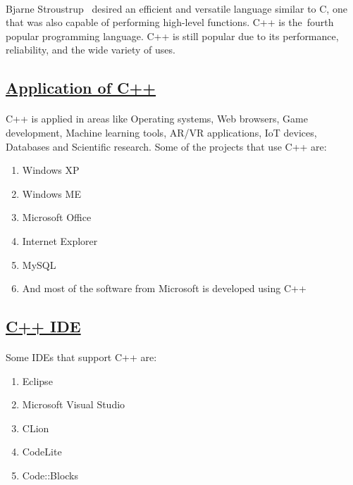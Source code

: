 \documentclass[[12pt]{article}
\begin{document}
	\paragraph{}
	Bjarne Stroustrup  desired an efficient and versatile language similar to C, one that was also capable of  performing  high-level functions. C++ is the fourth popular programming language. C++ is still popular due to its performance, reliability, and the wide variety of uses.
				
	
	\subsection*{\underline{Application of C++}}
	\paragraph{}
	C++ is applied in areas like Operating systems, Web browsers, Game development, Machine learning tools, AR/VR applications, IoT devices, Databases and Scientific research.
	Some of the projects that use C++ are:
	
	
	\begin{enumerate}
		\item Windows XP
		\item Windows ME
		\item Microsoft Office
		\item Internet Explorer
		\item MySQL
		\item And most of the software from Microsoft is developed using C++ 
		
		
	\end{enumerate}
	
	
	\subsection*{\underline{C++ IDE}}
	\paragraph{}
	Some IDEs that support C++ are:
	
	
	\begin{enumerate}
		\item Eclipse 
		\item Microsoft Visual Studio
		\item CLion
		\item CodeLite
		\item Code::Blocks
	\end{enumerate}
\end{document}
